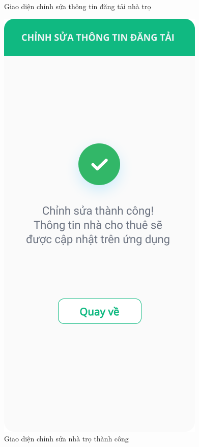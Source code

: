 \begin{figure}[!htb]
\begin{minipage}{0.32\textwidth}
     \caption{Giao diện chỉnh sửa thông tin đăng tải nhà trọ}
   \end{minipage}\hfill
   \begin{minipage}{0.32\textwidth}
     \centering
     \includegraphics[width=1\linewidth]{Images/UI figma/Upload Rooming House 6.png}
     \caption{Giao diện chỉnh sửa nhà trọ thành công}
   \end{minipage}
\end{figure}

